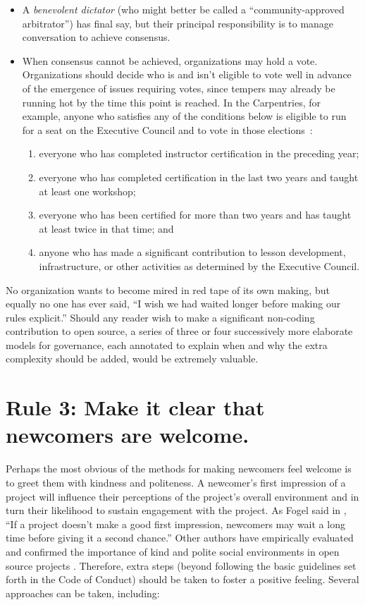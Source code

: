 \documentclass[10pt,letterpaper]{article}
\newcommand{\rulemajor}[1]{\section{#1}}
\begin{document}
\begin{itemize}
	
	\item
	A \emph{benevolent dictator} (who might better be called a ``community-approved arbitrator'') has final say,
	but their principal responsibility is to manage conversation to achieve consensus.
	
	\item
	When consensus cannot be achieved,
	organizations may hold a vote.
	Organizations should decide who is and isn't eligible to vote well in advance of the emergence of issues requiring votes,
	since tempers may already be running hot by the time this point is reached.
	In the Carpentries,
	for example,
	anyone who satisfies any of the conditions below is eligible to run for a seat on the Executive Council
	and to vote in those elections~\cite{carpentries-bylaws}:
	\begin{enumerate}
		\item everyone who has completed instructor certification in the preceding year;
		\item everyone who has completed certification in the last two years and taught at least one workshop;
		\item everyone who has been certified for more than two years and has taught at least twice in that time; and
		\item anyone who has made a significant contribution to lesson development, infrastructure, or other activities as determined by the Executive Council.
	\end{enumerate}
	
\end{itemize}

No organization wants to become mired in red tape of its own making,
but equally no one has ever said,
``I wish we had waited longer before making our rules explicit.''
Should any reader wish to make a significant non-coding contribution to open source,
a series of three or four successively more elaborate models for governance,
each annotated to explain when and why the extra complexity should be added, would be extremely valuable.

\rulemajor{Rule 3: Make it clear that newcomers are welcome.}

Perhaps the most obvious of the methods for making newcomers feel welcome is to greet them with kindness and politeness.
A newcomer's first impression of a project will influence their perceptions of the project's overall environment
and in turn their likelihood to sustain engagement with the project.
As Fogel said in \cite{fogel2005},
``If a project doesn't make a good first impression, newcomers may wait a long time before giving it a second chance.''
Other authors have empirically evaluated and confirmed the importance of kind and polite social environments
in open source projects \cite{singh2012,steinmacher2013,steinmacher2018}.
Therefore,
extra steps
(beyond following the basic guidelines set forth in the Code of Conduct)
should be taken to foster a positive feeling.
Several approaches can be taken, including:
\end{document}

